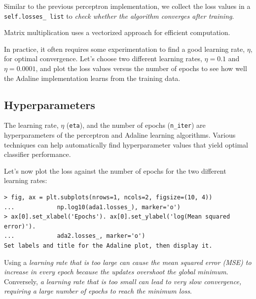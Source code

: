 \documentclass[../machine_learning_scikit.tex]{subfiles}
\begin{document}
    Similar to the previous perceptron implementation, we collect the loss values in a \lstinline|self.losses_ list| to \textit{check whether the algorithm converges after training}.

    \begin{obs}[Note]
        Matrix multiplication uses a vectorized approach for efficient computation.
    \end{obs}

    In practice, it often requires some experimentation to find a good learning rate, $\eta$, for optimal convergence. Let's choose two different learning rates, $\eta=0.1$ and $\eta=0.0001$, and plot the loss values versus the number of epochs to see how well the Adaline implementation learns from the training data.

    \subsection{Hyperparameters}

    The learning rate, $\eta$ (\lstinline|eta|), and the number of epochs (\lstinline|n_iter|) are hyperparameters of the perceptron and Adaline learning algorithms. Various techniques can help automatically find hyperparameter values that yield optimal classifier performance.

    Let's now plot the loss against the number of epochs for the two different learning rates:

    \begin{lstlisting}[caption={Loss for Two Different Learning Rates.},label=code:loss_two_different_learning_rates]
> fig, ax = plt.subplots(nrows=1, ncols=2, figsize=(10, 4))
...            np.log10(ada1.losses_), marker='o')
> ax[0].set_xlabel('Epochs'). ax[0].set_ylabel('log(Mean squared error)').
...            ada2.losses_, marker='o')
Set labels and title for the Adaline plot, then display it.
    \end{lstlisting}

    Using a \textit{learning rate that is too large can cause the mean squared error (MSE) to increase in every epoch because the updates overshoot the global minimum}. Conversely, \textit{a learning rate that is too small can lead to very slow convergence, requiring a large number of epochs to reach the minimum loss}.

    
\end{document}
